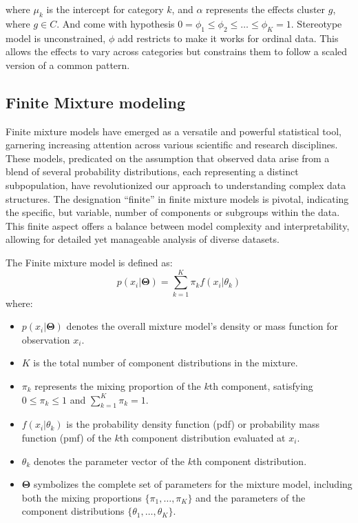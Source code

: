 \documentclass{article}
\begin{document}
where $\mu_k$ is the intercept for category $k$, 
and $\alpha$ represents the effects cluster $g$, where $g \in C$.
And come with hypothesis
$0 = \phi_1 \leq \phi_2 \leq \ldots \leq \phi_K = 1.$
Stereotype model is unconstrained, $\phi$ add restricts to make it works for ordinal data.
This allows the effects to vary across categories but constrains them to follow a scaled version of a common pattern.


\subsection{Finite Mixture modeling}

Finite mixture models have emerged as a versatile and powerful statistical tool, garnering increasing attention across various scientific and research disciplines. These models, predicated on the assumption that observed data arise from a blend of several probability distributions, each representing a distinct subpopulation, have revolutionized our approach to understanding complex data structures. The designation ``finite'' in finite mixture models is pivotal, indicating the specific, but variable, number of components or subgroups within the data. This finite aspect offers a balance between model complexity and interpretability, allowing for detailed yet manageable analysis of diverse datasets.

The Finite mixture model is defined as:
\begin{equation}
p(x_i|\mathbf{\Theta}) = \sum_{k=1}^{K} \pi_k f(x_i|\theta_k)
\end{equation}
where:
\begin{itemize}
    \item $p(x_i|\mathbf{\Theta})$ denotes the overall mixture model's density or mass function for observation $x_i$.
    \item $K$ is the total number of component distributions in the mixture.
    \item $\pi_k$ represents the mixing proportion of the $k$th component, satisfying $0 \leq \pi_k \leq 1$ and $\sum_{k=1}^{K} \pi_k = 1$.
    \item $f(x_i|\theta_k)$ is the probability density function (pdf) or probability mass function (pmf) of the $k$th component distribution evaluated at $x_i$.
    \item $\theta_k$ denotes the parameter vector of the $k$th component distribution.
    \item $\mathbf{\Theta}$ symbolizes the complete set of parameters for the mixture model, including both the mixing proportions $\{\pi_1, \ldots, \pi_K\}$ and the parameters of the component distributions $\{\theta_1, \ldots, \theta_K\}$.
\end{itemize}
\end{document}
